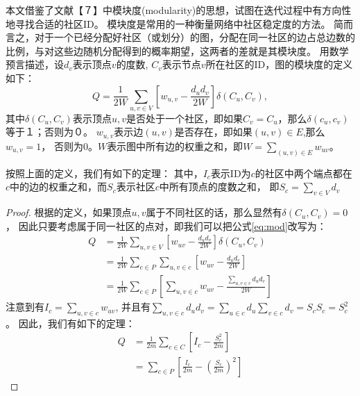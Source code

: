 \documentclass[master]{njuthesis}
\begin{document}
本文借鉴了文献【７】中模块度(modularity)的思想，试图在迭代过程中有方向性地寻找合适的社区ID。
模块度是常用的一种衡量网络中社区稳定度的方法。
简而言之，对于一个已经分配好社区（或划分）的图，分配在同一社区的边占总边数的比例，与对这些边随机分配得到的概率期望，这两者的差就是其模块度。
用数学预言描述，设$d_v$表示顶点$v$的度数, $C_v$表示节点$v$所在社区的ID，图的模块度的定义如下：
\begin{equation}
\label{eq:mod}
Q = \frac{1}{2W}\sum\limits_{u, v \in V} \left[w_{u,v} - \frac{{d_u}{d_v}}{2W} \right]\delta \left(C_u, C_v\right),
\end{equation}
其中$\delta(C_u, C_v)$表示顶点$u, v$是否处于一个社区，即如果$C_v = C_u$，那么$\delta(c_u, c_v)$等于１；否则为０。
$w_{u,v}$表示边$(u,v)$是否存在，即如果$(u,v)\in E$,那么$w_{u,v}=1$，
否则为0。$W$表示图中所有边的权重之和，即$W=\sum_{(u,v) \in E}w_{uv}$。

按照上面的定义，我们有如下的定理：
其中，$I_c$表示ID为$c$的社区中两个端点都在$c$中的边的权重之和，而$S_c$表示社区$c$中所有顶点的度数之和，
即$S_c = \sum_{v \in V} {d_v}$
\begin{proof}
根据\label{eq:modularity}的定义，如果顶点$u, v$属于不同社区的话，那么显然有$\delta(C_u, C_v)=0$，
因此只要考虑属于同一社区的点对，即我们可以把公式\ref{eq:mod}改写为：
\begin{equation}
\begin{aligned}
Q &= \frac{1}{2W}\sum\limits_{u, v \in V} \left[w_{uv} - \frac{{d_u}{d_v}}{2W} \right]\delta(C_u, C_v) \\
& = \frac{1}{2W}\sum\limits_{c \in P} {\sum\limits_{u, v \in c} { \left[w_{uv} - \frac{{d_u}{d_v}}{2W} \right]}} \\
& = \frac{1}{2W}\sum\limits_{c \in P} \left[{\sum\limits_{u, v \in c} { w_{uv} - \frac{\sum\nolimits_{u,v \in c}{{d_u}{d_v}}}{2W}}}\right] 
\end{aligned}
\end{equation}
注意到有$I_c=\sum\nolimits_{u, v \in c}  w_{uv}$, 
并且有$\sum\nolimits_{u,v \in c}{{d_u}{d_v}} =
\sum\nolimits_{u \in c}{d_u} \sum\nolimits_{v \in c}{d_v} = S_c S_c = {S^2_c}$。
因此，我们有如下的定理：
\begin{equation}
\begin{aligned}
Q &= \frac{1}{2m}\sum\limits_{c \in C} \left[I_c - \frac{S_c^2}{2m} \right] \\
& = \sum\limits_{c \in P} \left[\frac{I_c}{2m} - {\left(\frac{S_c}{2m}\right)}^2 \right]
\end{aligned}
\end{equation}
\end{proof}
\end{document}
